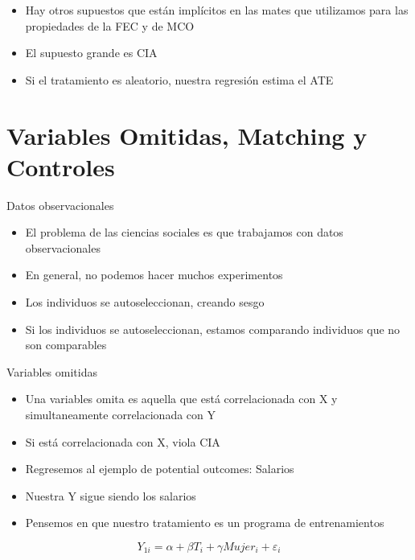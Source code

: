 \documentclass[
  ignorenonframetext,
]{beamer}
\providecommand{\tightlist}{%
  \setlength{\itemsep}{0pt}\setlength{\parskip}{0pt}}
\begin{document}
\begin{frame}{}
\protect\hypertarget{section-27}{}
\begin{itemize}
\tightlist
\item
  Hay otros supuestos que están implícitos en las mates que utilizamos
  para las propiedades de la FEC y de MCO
\item
  El supuesto grande es CIA
\item
  Si el tratamiento es aleatorio, nuestra regresión estima el ATE
\end{itemize}
\end{frame}

\hypertarget{variables-omitidas-matching-y-controles}{%
\section{Variables Omitidas, Matching y
Controles}\label{variables-omitidas-matching-y-controles}}

\begin{frame}{Datos observacionales}
\protect\hypertarget{datos-observacionales}{}
\begin{itemize}
\tightlist
\item
  El problema de las ciencias sociales es que trabajamos con datos
  observacionales
\item
  En general, no podemos hacer muchos experimentos
\item
  Los individuos se autoseleccionan, creando sesgo
\item
  Si los individuos se autoseleccionan, estamos comparando individuos
  que no son comparables
\end{itemize}
\end{frame}

\begin{frame}{Variables omitidas}
\protect\hypertarget{variables-omitidas}{}
\begin{itemize}
\tightlist
\item
  Una variables omita es aquella que está correlacionada con X y
  simultaneamente correlacionada con Y
\item
  Si está correlacionada con X, viola CIA
\item
  Regresemos al ejemplo de potential outcomes: Salarios
\end{itemize}
\end{frame}

\begin{frame}{}
\protect\hypertarget{section-28}{}
\begin{itemize}
\tightlist
\item
  Nuestra Y sigue siendo los salarios
\item
  Pensemos en que nuestro tratamiento es un programa de entrenamientos
\end{itemize}

\[Y_{1i}= \alpha+ \beta T_i+ \gamma Mujer_i+ \varepsilon_i\]
\end{frame}
\end{document}

